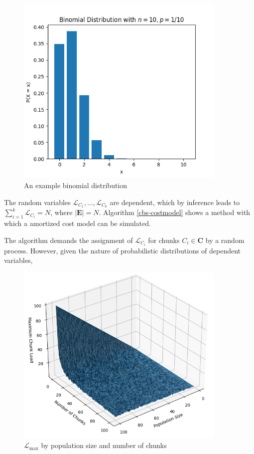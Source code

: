\documentclass[a4paper, 12pt]{report}
\theoremstyle{definition}
\begin{document}
\begin{figure}[ht!]
    \centering
    \includegraphics[width=0.9\textwidth]{img/binomialdistribution.png}
    \caption{An example binomial distribution}
\end{figure}

\noindent The random variables $\mathcal L_{C_1}, \ldots, \mathcal L_{C_k}$ are dependent, which by inference leads to $\sum_{i = 1}^k \mathcal L_{C_i} = N$, where $|\mathbf E| = N$. Algorithm \ref*{cbs-costmodel} shows a method with which a amortized cost model can be simulated.
\par The algorithm demands the assignment of $\mathcal L_{C_i}$ for chunks $C_i \in \mathbf C$ by a random process. However, given the nature of probabilistic distributions of dependent variables, 
\begin{figure}[ht!]
    \centering
    \includegraphics[width=0.9\textwidth]{img/mcl_simulation.png}
    \caption{$\mathcal L_{\max}$ by population size and number of chunks}
\end{figure}
\end{document}
